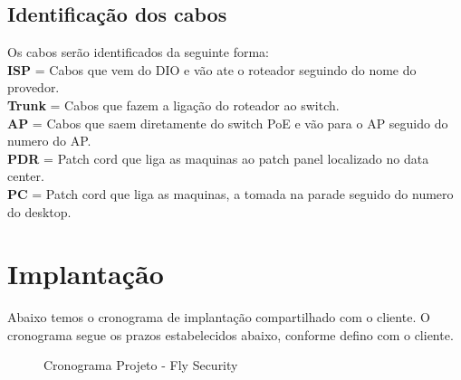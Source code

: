 \documentclass[	DIV=calc,%
							paper=a4,%
							fontsize=12pt,%
							onecolumn]{scrartcl}	 					%
\begin{document}





\subsection{Identificação dos cabos}
Os cabos serão identificados da seguinte forma:
\\

\textbf{ISP} = Cabos que vem do DIO e vão ate o roteador seguindo do nome do provedor.
\\

\textbf{Trunk} = Cabos que fazem a ligação do roteador ao switch.
\\

\textbf{AP} = Cabos que saem diretamente do switch PoE e vão para o AP seguido do numero do AP.
\\

\textbf{PDR} = Patch cord que liga as maquinas ao patch panel localizado no data center.
\\

\textbf{PC} = Patch cord que liga as maquinas, a tomada na parade seguido do numero do desktop.
\\


\section{Implantação}
Abaixo temos o cronograma de implantação compartilhado com o cliente. O cronograma segue os prazos estabelecidos abaixo, conforme defino com o cliente.

\begin{figure}[H]
	\noindent{}
	\caption{Cronograma Projeto - Fly Security}
	\label{tprack}
\end{figure}
\end{document}
